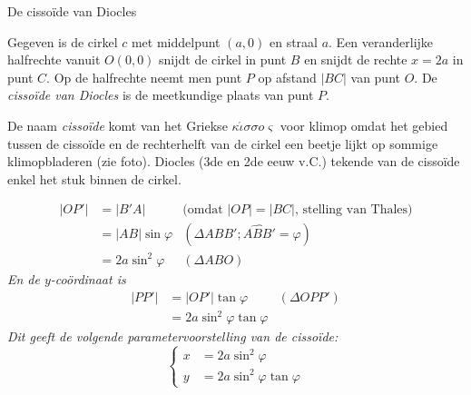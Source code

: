 \begin{lesactiviteit}{De cissoïde van Diocles}

Gegeven is de cirkel $c$ met middelpunt $(a, 0)$ en straal $a$. Een veranderlijke halfrechte vanuit $O (0, 0)$ snijdt de cirkel in punt $B$ en snijdt de rechte $x=2a$ in punt $C$. Op de halfrechte neemt men punt $P$ op afstand $|BC|$ van punt $O$. De \emph{cissoïde van Diocles} is de meetkundige plaats van punt $P$.

\begin{vraagenantwoord}
\end{vraagenantwoord}


De naam \emph{cissoïde} komt van het Griekse $\kappa \acute{\iota} \sigma \sigma o \varsigma$ voor klimop omdat het gebied tussen de cissoïde en de rechterhelft van de cirkel een beetje lijkt op sommige klimopbladeren (zie foto). Diocles (3de en 2de eeuw v.C.) tekende van de cissoïde enkel het stuk binnen de cirkel.


\begin{vraagenantwoord}[resume]

    
    $$
    \begin{array}{lll}
        |OP'|&=|B'A|&(\text{omdat } |OP|=|BC|\text{, stelling van Thales)}\\
        &=|AB|\sin{\varphi}&(\Delta ABB'; \widehat{ABB'}=\varphi)\\
        &=2a\sin^2{\varphi}&(\Delta ABO)
            \end{array}
    $$
    \emph{En de $y$-coördinaat is}
    $$
    \begin{array}{lll}
        |PP'|&=|OP'|\tan{\varphi}&(\Delta OPP')\\
        &=2a\sin^2{\varphi}\tan{\varphi}&
    \end{array}
    $$
    \emph{Dit geeft de volgende parametervoorstelling van de cissoïde:}
    $$
    \left\{    
        \begin{array}{ll}
        x&=2a\sin^2{\varphi}\\
        y&=2a\sin^2{\varphi}\tan{\varphi}
    \end{array}
    \right.
    $$
    

\end{vraagenantwoord}
\end{lesactiviteit}
